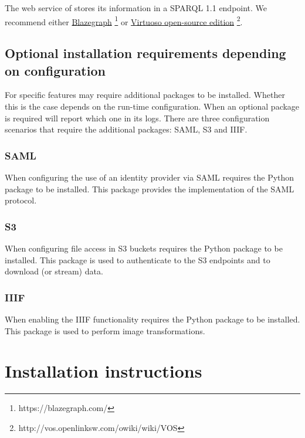 
  The web service of  stores its information in a SPARQL 1.1
  \citep{sparql-11} endpoint.  We recommend either
  \href{https://blazegraph.com/}{Blazegraph}%
  \footnote{https://blazegraph.com/}
  or \href{http://vos.openlinksw.com/owiki/wiki/VOS}%
  {Virtuoso open-source edition}%
  \footnote{http://vos.openlinksw.com/owiki/wiki/VOS}.

\subsection{Optional installation requirements depending on configuration}

  For specific features  may require additional packages to be
  installed.  Whether this is the case depends on the run-time configuration.
  When an optional package is required  will report which one in
  its logs.  There are three configuration scenarios that require the
  additional packages: SAML, S3 and IIIF.

\subsubsection{SAML}

  When configuring the use of an identity provider via SAML 
  requires the  Python package to be installed.  This
  package provides the implementation of the SAML protocol.

\subsubsection{S3}

  When configuring file access in S3 buckets  requires the
   Python package to be installed.  This package is used to
  authenticate to the S3 endpoints and to download (or stream) data.

\subsubsection{IIIF}

  When enabling the IIIF functionality  requires the
   Python package to be installed.  This package is used to
  perform image transformations.

\section{Installation instructions}

